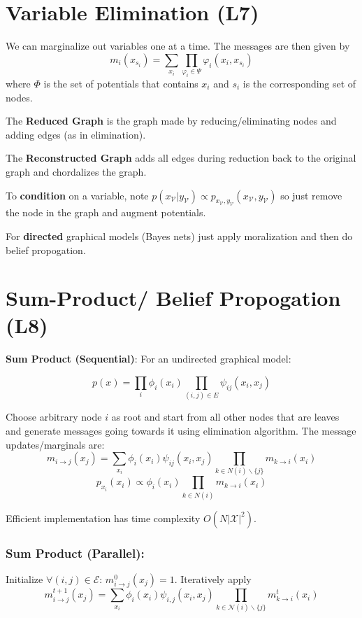 \documentclass[9pt]{article}
\begin{document}
\begin{multicols}{2}
\section{Variable Elimination (L7)}
We can marginalize out variables one at a time. The messages are then given by
$$m_i(x_{s_i}) = \sum\limits_{x_i} \prod\limits_{\varphi_i \in \Psi} \varphi_i(x_i, x_{s_i})$$
where $\Phi$ is the set of potentials that contains $x_i$ and $s_i$ is the 
corresponding set of nodes. 

The \textbf{Reduced Graph} is the graph made by reducing/eliminating nodes and 
adding edges (as in elimination). 

The \textbf{Reconstructed Graph} adds all edges during reduction back to the 
original graph and chordalizes the graph. 

To \textbf{condition} on a variable, note $p(x_{\mathcal{V}}|y_{\mathcal{V}})
\propto p_{x_{\mathcal{V}},y_{\mathcal{V}}}(x_{\mathcal{V}}, y_{\mathcal{V}})$ 
so just remove the node in the graph and augment potentials. 

For \textbf{directed} graphical models (Bayes nets) just apply moralization and
then do belief propogation.
\section{Sum-Product/ Belief Propogation (L8)}
\textbf{Sum Product (Sequential)}: For an undirected graphical model:

$$p(x) = \prod\limits_i \phi_i(x_i) \prod\limits_{(i, j) \in E} \psi_{ij}(x_i, x_j)$$

Choose arbitrary node $i$ as root and start
from all other nodes that are leaves and generate messages going towards it
using elimination algorithm. The message updates/marginals are:
$$m_{i \rightarrow j}(x_j) = \sum\limits_{x_i} \phi_i(x_i)\psi_{ij}(x_i, x_j) \prod\limits_{k \in N(i) \backslash \{j\}} m_{k \rightarrow i}(x_i)$$
$$p_{x_i}(x_i) \propto \phi_i(x_i) \prod\limits_{k \in N(i)} m_{k \rightarrow i}(x_i)$$

Efficient implementation has time complexity $O(N|\mathcal{X}|^2)$. 

\subsubsection{Sum Product (Parallel):}
Initialize $\forall (i,j) \in \mathcal{E}$: $m^0_{i \to j}(x_j)=1$.  Iteratively apply $$m_{i \to j}^{t+1} (x_j) = \sum\limits_{x_i}\phi_i(x_i)\psi_{i,j}
(x_i,x_j)\prod_{k \in \mathcal{N}(i) \backslash \{j\}} m^{t}_{k \to i}(x_i)$$


\end{multicols}
\end{document}
